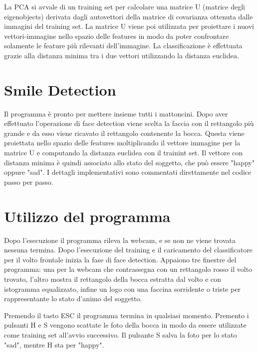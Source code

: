 \documentclass{article}
\begin{document}
La PCA si avvale di un training set per calcolare una matrice U (matrice degli eigenobjects) derivata dagli autovettori della matrice di covarianza ottenuta dalle immagini del training set. La matrice U viene poi utilizzata per proiettare i nuovi vettori-immagine nello spazio delle features in modo da poter confrontare solamente le feature più rilevanti dell'immagine. La classificazione è effettuata grazie alla distanza minima tra i due vettori utilizzando la distanza euclidea\cite{Smith2002,Shlens05atutorial}.

\section{Smile Detection}
Il programma è pronto per mettere insieme tutti i mattoncini. Dopo aver effettuato l'operazione di face detection viene scelta la faccia con il rettangolo più grande e da esso viene ricavato il rettangolo contenente la bocca. Questa viene proiettata nello spazio delle features moltiplicando il vettore immagine per la matrice U e computando la distanza euclidea con il trainint set. Il vettore con distanza minima è quindi associato allo stato del soggetto, che può essere "happy" oppure "sad". I dettagli implementativi sono commentati direttamente nel codice passo per passo.

\section{Utilizzo del programma}
Dopo l'esecuzione il programma rileva la webcam, e se non ne viene trovata nessuna termina. Dopo l'esecuzione del training e il caricamento del classificatore per il volto frontale inizia la fase di face detection. Appaiono tre finestre del programma: una per la webcam che contrassegna con un rettangolo rosso il volto trovato, l'altro mostra il rettangolo della bocca estratta dal volto e con istogramma equalizzato, infine un logo con una faccina sorridente o triste per rappresentante lo stato d'animo del soggetto.

Premendo il tasto ESC il programma termina in qualsiasi momento. Premento i pulsanti H e S vengono scattate le foto della bocca in modo da essere utilizzate come training set all'avvio successivo. Il pulsante S salva la foto per lo stato "sad", mentre H sta per "happy".





\end{document}
